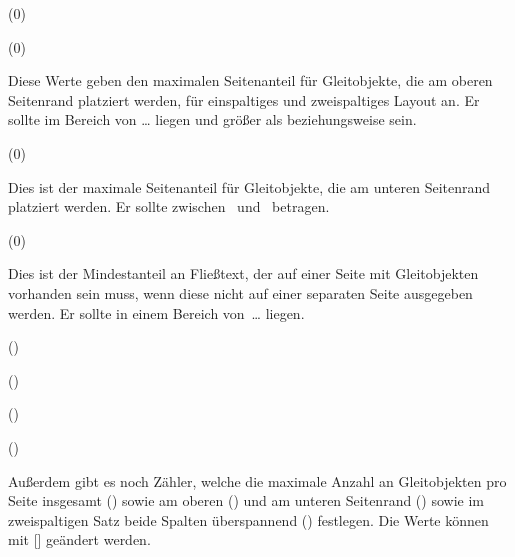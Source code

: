 \begin{Declaration}
  {}
  (0\topfraction)
\begin{Declaration}
  {}
  (0\dbltopfraction)
\printdeclarationlist

Diese Werte geben den maximalen Seitenanteil für Gleitobjekte, die am oberen 
Seitenrand platziert werden, für einspaltiges und zweispaltiges Layout an. Er 
sollte im Bereich von \dots{} liegen und größer als 
 beziehungsweise  sein.
\end{Declaration}
\end{Declaration}

\begin{Declaration}
  {}
  (0\bottomfraction)
\printdeclarationlist

Dies ist der maximale Seitenanteil für Gleitobjekte, die am unteren Seitenrand 
platziert werden. Er sollte zwischen~ und~ betragen.
\end{Declaration}

\begin{Declaration}
  {}
  (0\textfraction)
\printdeclarationlist

Dies ist der Mindestanteil an Fließtext, der auf einer Seite mit Gleitobjekten 
vorhanden sein muss, wenn diese nicht auf einer separaten Seite ausgegeben 
werden. Er sollte in einem Bereich von~\dots{} liegen.
\end{Declaration}

\begin{Declaration}
  {}
  ()
\begin{Declaration}
  {}
  ()
\begin{Declaration}
  {}
  ()
\begin{Declaration}
  {}
  ()
\printdeclarationlist[Zähler]

Außerdem gibt es noch Zähler, welche die maximale Anzahl an Gleitobjekten pro 
Seite insgesamt () sowie am oberen () 
und am unteren Seitenrand () sowie im zweispaltigen 
Satz beide Spalten überspannend () festlegen. Die Werte 
können mit [] geändert 
werden.
\end{Declaration}
\end{Declaration}
\end{Declaration}
\end{Declaration}

